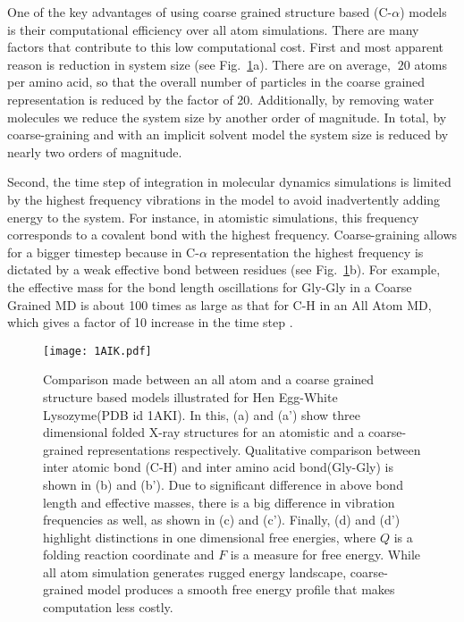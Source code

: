 \documentclass[../talant.diss.submit.tex]{subfiles}
\begin{document}
One of the key advantages of using coarse grained structure based (C-$\alpha$)
models is their computational efficiency over all atom
simulations\cite{takada:12}. There are many factors that contribute to this low
computational cost. First and most apparent reason is reduction in system size
(see Fig.~\ref{fig:1AIK}a). There are on average, $~20$ atoms per amino acid, so
that the overall number of particles in the coarse grained representation is
reduced by the factor of 20. Additionally, by removing water molecules we reduce the
system size by another order of magnitude. In total, by coarse-graining and with
an implicit solvent model the system size is reduced by nearly two orders of magnitude.

Second, the time step of integration in molecular dynamics simulations is limited 
by the highest frequency vibrations in the model to avoid inadvertently adding energy to
the system. For instance, in atomistic simulations, this frequency corresponds
to a covalent  bond with the highest frequency.
Coarse-graining allows for a bigger timestep
because in C-$\alpha$ representation the highest frequency is dictated by a weak effective bond between
residues (see Fig.~\ref{fig:1AIK}b).
For example, the effective mass for the bond length oscillations for Gly-Gly in a Coarse Grained MD is about 100
times as large as that for C-H in an All Atom MD, which gives a factor of 10 increase in the time step
\cite{takada:12}.

\begin{figure}[htp!]
  \begin{centering}
    \texttt{[image: 1AIK.pdf]}
    \caption{Comparison made between an all atom and a coarse grained
      structure based models illustrated for Hen Egg-White Lysozyme(PDB id 1AKI).
      In this, (a) and (a') show three dimensional folded X-ray structures for an atomistic and a coarse-grained
      representations respectively. Qualitative comparison between inter atomic bond (C-H) and inter
      amino acid bond(Gly-Gly) is shown in (b) and (b'). Due to significant difference in above bond length
      and effective masses, there is a big difference in vibration frequencies as well, as shown in (c)
      and (c'). Finally, (d) and (d') highlight distinctions in one dimensional free energies, where $Q$ is
      a folding reaction coordinate and $F$ is a measure for free energy. While all atom simulation generates
      rugged energy landscape, coarse-grained model produces a smooth free energy profile that makes computation
      less costly.}                
    \label{fig:1AIK}                                                                                  
  \end{centering}                                                                                          
\end{figure}
\end{document}

